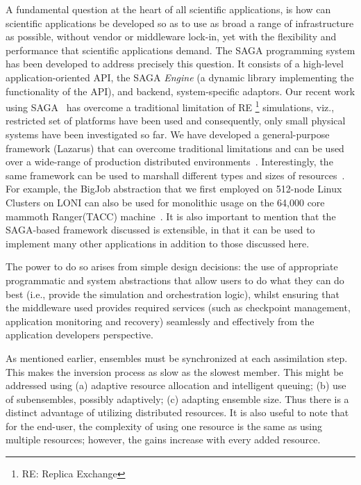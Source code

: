 \documentclass{acm_proc_article-sp}
\begin{document}
A fundamental question at the heart of all scientific applications, is
 how can scientific applications be developed so as to
use as broad a range of infrastructure as possible, without vendor or
middleware lock-in, yet with the flexibility and performance that
scientific applications demand. The SAGA programming system has been
developed to address precisely this question. It consists of a
high-level application-oriented API, the SAGA {\it Engine} (a dynamic
library implementing the functionality of the API), and backend,
system-specific adaptors.  Our recent work using
SAGA~\cite{saga-papers} has overcome a traditional limitation of RE \footnote{RE: Replica Exchange}
simulations, viz., restricted set of platforms have been used and
consequently, only small physical systems have been investigated so
far. We have developed a general-purpose framework (Lazarus) that can overcome
traditional limitations and can be used over a wide-range of
production distributed environments~\cite{saga-royalsoc}.
Interestingly, the same framework can be used to marshall different
types and sizes of resources~\cite{saga-papers}. For example, the
BigJob abstraction that we first employed on 512-node Linux Clusters
on LONI can also be used for monolithic usage on the 64,000 core
mammoth Ranger(TACC) machine~\cite{saga-iccs09}.  It is also important
to mention that the SAGA-based framework discussed is extensible, in
that it can be used to implement many other applications in addition
to those discussed here.

The power to do so arises from simple design decisions: the use of
appropriate programmatic and system abstractions that allow users to
do what they can do best (i.e., provide the simulation and
orchestration logic), whilst ensuring that the middleware used
provides required services (such as checkpoint management, application
monitoring and recovery) seamlessly and effectively from the
application developers perspective. 

As mentioned earlier, ensembles must be synchronized at each assimilation step. This makes
the inversion process as slow as the slowest member. This might be
addressed using (a) adaptive resource allocation and intelligent
queuing; (b) use of subensembles, possibly adaptively; (c) adapting
ensemble size.  Thus there is a distinct advantage of utilizing
distributed resources.  It is also useful to note that for the end-user, the
complexity of using one resource is the same as using multiple
resources; however, the gains increase with every added resource.
\end{document}
